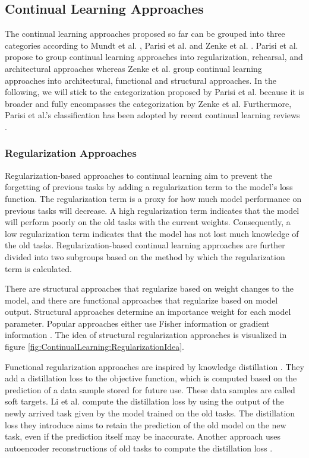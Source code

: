 \subsection{Continual Learning Approaches}
\label{sec:ContinualLearningApproaches}
The continual learning approaches proposed so far can be grouped into three categories according to Mundt et al. \cite{mundt2020wholistic}, Parisi et al. \cite{parisi2019continual}
and Zenke et al. \cite{zenke2017continual}. Parisi et al. propose to group continual learning approaches into regularization, rehearsal,
and architectural approaches whereas Zenke et al.
\cite{zenke2017continual} group continual learning approaches into architectural, functional and structural approaches. In the following, we will stick to the
categorization proposed by Parisi et al. because it is broader and fully encompasses the categorization by Zenke et al. Furthermore, Parisi et al.'s classification has been adopted by
recent continual learning reviews \cite{mundt2020wholistic}.

\subsubsection{Regularization Approaches}
\label{sec:RegularizationApproaches}
Regularization-based approaches to continual learning aim to prevent the forgetting of previous tasks by adding a regularization term to
the model's loss function. The regularization term is a proxy for how much model performance on previous tasks will decrease. A high
regularization term indicates that the model will perform poorly on the old tasks with the current weights. Consequently, a low regularization
term indicates that the model has not lost much knowledge of the old tasks. Regularization-based continual learning approaches are further
divided into two subgroups based on the method by which the regularization term is calculated. \par
There are structural approaches that regularize based on weight changes to the model, and there are functional
approaches that regularize based on model output. Structural approaches determine an importance weight for each
model parameter. Popular approaches either use Fisher information \parencite{kirkpatrick2017overcoming,lee2017overcoming} or
gradient information \parencite{aljundi2018memory,zenke2017continual}. The idea of structural regularization approaches is visualized in
figure \ref{fig:ContinualLearning:RegularizationIdea}. \par
Functional regularization approaches are inspired by knowledge distillation \cite{hinton2015distilling}. They add a distillation
loss to the objective function, which is computed based on the prediction of a data sample stored for future use. These data samples
are called soft targets. Li et al. \cite{li2017learning} compute the distillation loss by using the output of the newly arrived task
given by the model trained on the old tasks. The distillation loss they introduce aims to retain the prediction of the old model on
the new task, even if the prediction itself may be inaccurate. Another approach uses autoencoder reconstructions of old tasks to
compute the distillation loss \cite{rannen2017encoder}.

